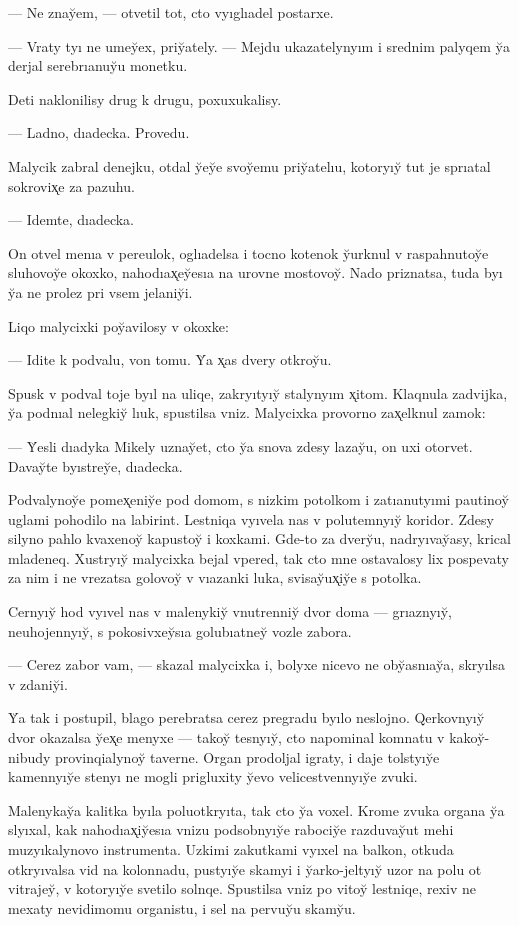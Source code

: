 \documentclass[10pt]{book}
\begin{document}
— Ne znay̆em, — otvetil tot, cto vyıglıadel postarxe.

— Vraty tyı ne umey̆ex, priy̆ately. — Mejdu ukazatelynyım i srednim palyqem y̆a derjal serebrıanuy̆u monetku.

Deti naklonilisy drug k drugu, poxuxukalisy.

— Ladno, dıadecka. Provedu.

Malycik zabral denejku, otdal y̆ey̆e svoy̆emu priy̆atelıu, kotoryıy̆ tut je sprıatal sokrovix̨e za pazuhu.

— Idemte, dıadecka.

On otvel menıa v pereulok, oglıadelsa i tocno kotenok y̆urknul v raspahnutoy̆e sluhovoy̆e okoxko, nahodıax̨ey̆esıa na urovne mostovoy̆. Nado priznatsa, tuda byı y̆a ne prolez pri vsem jelaniy̆i.

Liqo malycixki poy̆avilosy v okoxke:

— Idite k podvalu, von tomu. Y̆a x̨as dvery otkroy̆u.

Spusk v podval toje byıl na uliqe, zakryıtyıy̆ stalynyım x̨itom. Klaqnula zadvijka, y̆a podnıal nelegkiy̆ lıuk, spustilsa vniz. Malycixka provorno zax̨elknul zamok:

— Y̆esli dıadyka Mikely uznay̆et, cto y̆a snova zdesy lazay̆u, on uxi otorvet. Davay̆te byıstrey̆e, dıadecka.

Podvalynoy̆e pomex̨eniy̆e pod domom, s nizkim potolkom i zatıanutyımi pautinoy̆ uglami pohodilo na labirint. Lestniqa vyıvela nas v polutemnyıy̆ koridor. Zdesy silyno pahlo kvaxenoy̆ kapustoy̆ i koxkami. Gde-to za dvery̆u, nadryıvay̆asy, krical mladeneq. Xustryıy̆ malycixka bejal vpered, tak cto mne ostavalosy lix pospevaty za nim i ne vrezatsa golovoy̆ v vıazanki luka, svisay̆ux̨iy̆e s potolka.

Cernyıy̆ hod vyıvel nas v malenykiy̆ vnutrenniy̆ dvor doma — grıaznyıy̆, neuhojennyıy̆, s pokosivxey̆sıa golubıatney̆ vozle zabora.

— Cerez zabor vam, — skazal malycixka i, bolyxe nicevo ne oby̆asnıay̆a, skryılsa v zdaniy̆i.

Y̆a tak i postupil, blago perebratsa cerez pregradu byılo neslojno. Qerkovnyıy̆ dvor okazalsa y̆ex̨e menyxe — takoy̆ tesnyıy̆, cto napominal komnatu v kakoy̆-nibudy provinqialynoy̆ taverne. Organ prodoljal igraty, i daje tolstyıy̆e kamennyıy̆e stenyı ne mogli prigluxity y̆evo velicestvennyıy̆e zvuki.

Malenykay̆a kalitka byıla poluotkryıta, tak cto y̆a voxel. Krome zvuka organa y̆a slyıxal, kak nahodıax̨iy̆esıa vnizu podsobnyıy̆e rabociy̆e razduvay̆ut mehi muzyıkalynovo instrumenta. Uzkimi zakutkami vyıxel na balkon, otkuda otkryıvalsa vid na kolonnadu, pustyıy̆e skamyi i y̆arko-jeltyıy̆ uzor na polu ot vitrajey̆, v kotoryıy̆e svetilo solnqe. Spustilsa vniz po vitoy̆ lestniqe, rexiv ne mexaty nevidimomu organistu, i sel na pervuy̆u skamy̆u.
\end{document}
